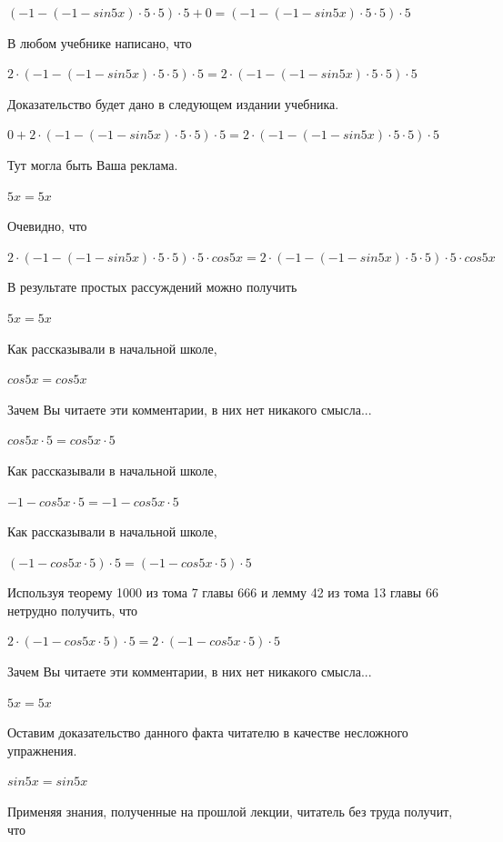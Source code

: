 \documentclass[12pt,a4paper,fleqn]{article}
\theoremstyle{definition}
\begin{document}
$( -1  - ( -1  - sin 5  x ) \cdot  5  \cdot  5 ) \cdot  5  +  0  = ( -1  - ( -1  - sin 5  x ) \cdot  5  \cdot  5 ) \cdot  5 $

В любом учебнике написано, что 

$ 2  \cdot ( -1  - ( -1  - sin 5  x ) \cdot  5  \cdot  5 ) \cdot  5  =  2  \cdot ( -1  - ( -1  - sin 5  x ) \cdot  5  \cdot  5 ) \cdot  5 $

Доказательство будет дано в следующем издании учебника. 

$ 0  +  2  \cdot ( -1  - ( -1  - sin 5  x ) \cdot  5  \cdot  5 ) \cdot  5  =  2  \cdot ( -1  - ( -1  - sin 5  x ) \cdot  5  \cdot  5 ) \cdot  5 $

Тут могла быть Ваша реклама. 

$ 5  x  =  5  x $

Очевидно, что 

$ 2  \cdot ( -1  - ( -1  - sin 5  x ) \cdot  5  \cdot  5 ) \cdot  5  \cdot cos 5  x  =  2  \cdot ( -1  - ( -1  - sin 5  x ) \cdot  5  \cdot  5 ) \cdot  5  \cdot cos 5  x $

В результате простых рассуждений можно получить 

$ 5  x  =  5  x $

Как рассказывали в начальной школе, 

$cos 5  x  = cos 5  x $

Зачем Вы читаете эти комментарии, в них нет никакого смысла... 

$cos 5  x  \cdot  5  = cos 5  x  \cdot  5 $

Как рассказывали в начальной школе, 

$ -1  - cos 5  x  \cdot  5  =  -1  - cos 5  x  \cdot  5 $

Как рассказывали в начальной школе, 

$( -1  - cos 5  x  \cdot  5 ) \cdot  5  = ( -1  - cos 5  x  \cdot  5 ) \cdot  5 $

Используя теорему 1000 из тома 7 главы 666 и лемму 42 из тома 13 главы 66 нетрудно получить, что 

$ 2  \cdot ( -1  - cos 5  x  \cdot  5 ) \cdot  5  =  2  \cdot ( -1  - cos 5  x  \cdot  5 ) \cdot  5 $

Зачем Вы читаете эти комментарии, в них нет никакого смысла... 

$ 5  x  =  5  x $

Оставим доказательство данного факта читателю в качестве несложного упражнения. 

$sin 5  x  = sin 5  x $

Применяя знания, полученные на прошлой лекции, читатель без труда получит, что 
\end{document}

